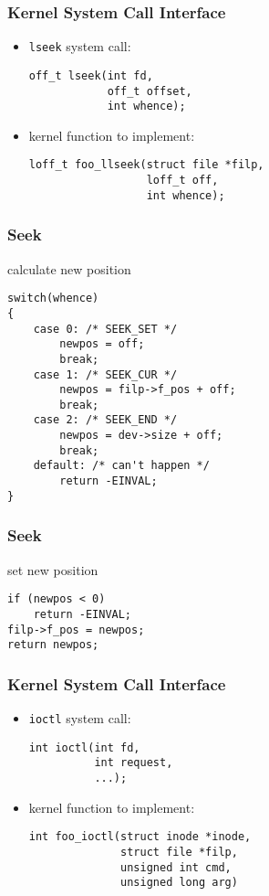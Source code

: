 \documentclass[dvipsnames]{beamer}
\begin{document}
\begin{frame}[fragile]
  \frametitle{Kernel System Call Interface}

  \begin{itemize}
    \item \lstinline|lseek| system call:
    \begin{lstlisting}
off_t lseek(int fd,
            off_t offset,
            int whence);
    \end{lstlisting}

    \medskip
    \item kernel function to implement:
    \begin{lstlisting}
loff_t foo_llseek(struct file *filp,
                  loff_t off,
                  int whence);
    \end{lstlisting}
  \end{itemize}
\end{frame}

\begin{frame}[fragile]
  \frametitle{Seek}

  \begin{exampleblock}{calculate new position}
    \begin{lstlisting}
switch(whence)
{
    case 0: /* SEEK_SET */
        newpos = off;
        break;
    case 1: /* SEEK_CUR */
        newpos = filp->f_pos + off;
        break;
    case 2: /* SEEK_END */
        newpos = dev->size + off;
        break;
    default: /* can't happen */
        return -EINVAL;
}
    \end{lstlisting}
  \end{exampleblock}
\end{frame}

\begin{frame}[fragile]
  \frametitle{Seek}

  \begin{exampleblock}{set new position}
    \begin{lstlisting}
if (newpos < 0)
    return -EINVAL;
filp->f_pos = newpos;
return newpos;
    \end{lstlisting}
  \end{exampleblock}
\end{frame}

\begin{frame}[fragile]
  \frametitle{Kernel System Call Interface}

  \begin{itemize}
    \item \lstinline|ioctl| system call:
    \begin{lstlisting}
int ioctl(int fd,
          int request,
          ...);
    \end{lstlisting}

    \medskip
    \item kernel function to implement:
    \begin{lstlisting}
int foo_ioctl(struct inode *inode,
              struct file *filp,
              unsigned int cmd,
              unsigned long arg)
    \end{lstlisting}
  \end{itemize}
\end{frame}
\end{document}
